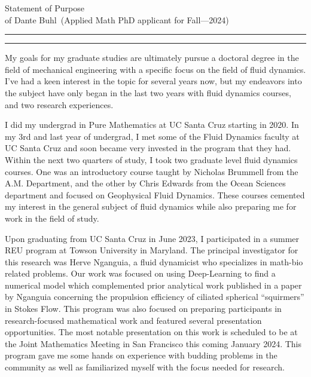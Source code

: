 \documentclass{article}
\newcommand{\soptitle}{Statement of Purpose}
\newcommand{\yourname}{Dante Buhl}
\begin{document}
\begin{center}\LARGE\soptitle\\
\large of \yourname\ (Applied Math PhD applicant for Fall---2024)
\end{center}

\hrule
\vspace{1pt}
\hrule height 1pt

\bigskip

\large
My goals for my graduate studies are ultimately pursue a doctoral degree in the field of mechanical engineering with a specific focus on the field of fluid dynamics. I've had a keen interest in the topic for several years now, but my endeavors into the subject have only began in the last two years with fluid dynamics courses, and two research experiences. 

I did my undergrad in Pure Mathematics at UC Santa Cruz starting in 2020. In my 3rd and last year of undergrad, I met some of the Fluid Dynamics faculty at UC Santa Cruz and soon became very invested in the program that they had. Within the next two quarters of study, I took two graduate level fluid dynamics courses. One was an introductory course taught by Nicholas Brummell from the A.M. Department, and the other by Chris Edwards from the Ocean Sciences department and focused on Geophysical Fluid Dynamics. These courses cemented my interest in the general subject of fluid dynamics while also preparing me for work in the field of study. 

Upon graduating from UC Santa Cruz in June 2023, I participated in a summer REU program at Towson University in Maryland. The principal investigator for this research was Herve Nganguia, a fluid dynamicist who specializes in math-bio related problems. Our work was focused on using Deep-Learning to find a numerical model which complemented prior analytical work published in a paper by Nganguia concerning the propulsion efficiency of ciliated spherical ``squirmers'' in Stokes Flow. This program was also focused on preparing participants in research-focused mathematical work and featured several presentation opportunities. The most notable presentation on this work is scheduled to be at the Joint Mathematics Meeting in San Francisco this coming January 2024. This program gave me some hands on experience with budding problems in the community as well as familiarized myself with the focus needed for research. 
\end{document}
